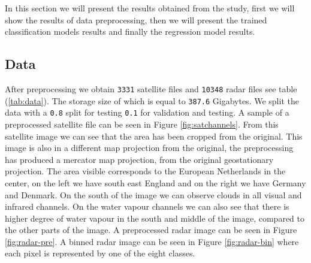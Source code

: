 In this section we will present the results obtained from the study, first we will show the results of data preprocessing, then we will present the trained classification models results and finally the regression model results.

\subsection{Data}
After preprocessing we obtain \texttt{3331} satellite files and \texttt{10348} radar files see table (\ref{tab:data}).
The storage size of which is equal to \texttt{387.6} Gigabytes.
We split the data with a \texttt{0.8} split for testing \texttt{0.1} for validation and testing.
A sample of a preprocessed satellite file can be seen in Figure \ref{fig:satchannels}.
From this satellite image we can see that the area has been cropped from the original.
This image is also in a different map projection from the original, the preprocessing has produced a mercator map projection,
from the original geostationary projection.
The area visible corresponds to the European Netherlands in the center, on the left we have south east England and on the right we have Germany and Denmark.
On the south of the image we can observe clouds in all visual and infrared channels.
On the water vapour channels we can also see that there is higher degree of water vapour in the south and middle of the image, compared to the other parts of the image.
A preprocessed radar image can be seen in Figure \ref{fig:radar-pre}. A binned radar image can be seen in Figure \ref{fig:radar-bin} where each pixel is represented by one of the eight classes.

